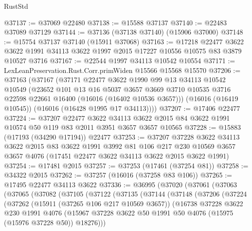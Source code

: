 \begin{lexlean}{RustStd}
\begin{coremodule}
@37137 := @37069 @22480
@37138 := @15588 @37137
@37140 := @22483 @37089 @37129
@37144 := @37136 (@37138 @37140) (@15906 @37000)
@37148 := @15754 @37137 @37140 (@15911 @37068)
@37163 := @17218
    @22477
    @3622
    @3622
    @1991
    @34113
    @3622
    @1997
    @2015
    @17227
    @10556
    @10575
    @83
    @3879
    @10527
    @3716
@37167 := @22544 @1997 @34113 @10542 @10554
@37171 := LexLeanPreservation.Rust.Corr.primWiden @15566 @15568 @15570
@37206 := @37163
    (@37167
      (@37171
        @22477
        @3622
        @1990
        @99
        @13
        @34113
        @10542
        @10549
        (@23652
          @101
          @13
          @16
          @5037
          @3657
          @3669
          @3710
          @10535
          @3716
          @22598
          @22661
          @16400
          (@16016 (@16402 @10536 @3657)))
        (@16016 (@16419 @10545))
        (@16016 (@16428 @1995 @17 @34113))))
@37207 := @17406 @22477
@37224 := @37207
    @22477
    @3622
    @34113
    @3622
    @2015
    @84
    @3622
    @1991
    @10574
    @50
    @119
    @83
    @2011
    @3951
    @3657
    @3657
    @10565
@37228 := @15883 (@17193 (@34290 @17194)) @22477
@37253 := @37207
    @37228
    @3622
    @34113
    @3622
    @2015
    @83
    @3622
    @1991
    @3992
    @81
    @106
    @217
    @230
    @10569
    @3657
    @3657
    @4076
    (@17451 @22477 @3622 @34113 @3622 @2015 @3622 @1991)
@37254 := @17481 @2015
@37257 := @37253 (@17461 (@37254 @81))
@37258 := @34322 @2015
@37262 := @37257 (@16016 (@37258 @83 @106))
@37265 := @17495 @22477 @34113 @3622
@37336 := @36995
    (@37020
      (@37061
        (@37063
          (@37065
            (@37082
              (@37105
                (@37122
                  (@37135
                    (@37144
                      (@37148
                        (@37206
                          (@37224
                            (@37262
                              (@15911 (@37265 @106 @217 @10569 @3657))
                              (@16738
                                @37228
                                @3622
                                @230
                                @1991
                                @4076
                                (@15967
                                  @37228
                                  @3622
                                  @50
                                  @1991
                                  @50
                                  @4076
                                  (@15975 (@15976 @37228 @50))
                                  @18276)))

\end{coremodule}
\end{lexlean}
